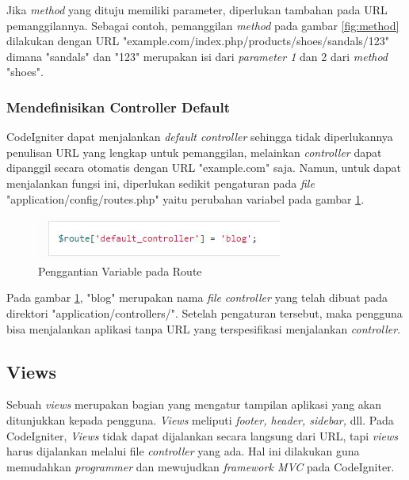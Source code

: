 		Jika \textit{method} yang dituju memiliki parameter, diperlukan tambahan pada URL pemanggilannya. Sebagai contoh, pemanggilan \textit{method}	pada gambar \ref{fig:method} dilakukan dengan URL "example.com/index.php/products/shoes/sandals/123" dimana "sandals" dan "123" merupakan isi dari \textit{parameter 1} dan 2 dari \textit{method} "shoes".
		
	\subsubsection{Mendefinisikan Controller Default}
	\label{subsub: defaulController}
	
		CodeIgniter dapat menjalankan \textit{default controller} sehingga tidak diperlukannya penulisan URL yang lengkap untuk pemanggilan, melainkan \textit{controller} dapat dipanggil secara otomatis dengan URL "example.com" saja. Namun, untuk dapat menjalankan fungsi ini, diperlukan sedikit pengaturan pada \textit{file} "application/config/routes.php" yaitu perubahan variabel pada gambar \ref{fig:route}.
		
		\begin{figure}[H]
			\centering
			\includegraphics[scale=1]{Gambar/route}
			\caption{Penggantian Variable pada Route}
			\label{fig:route}
		\end{figure}
		
		Pada gambar \ref{fig:route}, "blog" merupakan nama \textit{file} \textit{controller} yang telah dibuat pada direktori "application/controllers/". Setelah pengaturan tersebut, maka pengguna bisa menjalankan aplikasi tanpa URL yang terspesifikasi menjalankan \textit{controller}.
		
		\subsection{Views}
		\label{sub: views}
		
		Sebuah \textit{views} merupakan bagian yang mengatur tampilan aplikasi yang akan ditunjukkan kepada pengguna. \textit{Views} meliputi \textit{footer, header, sidebar,} dll.
		Pada CodeIgniter, \textit{Views} tidak dapat dijalankan secara langsung dari URL, tapi \textit{views} harus dijalankan melalui file \textit{controller} yang ada. Hal ini dilakukan guna memudahkan \textit{programmer} dan mewujudkan \textit{framework MVC} pada CodeIgniter.
		
